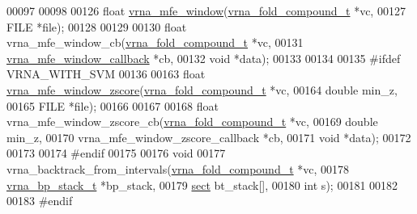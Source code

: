 \begin{DoxyCode}
00097 
00098 
00126 \textcolor{keywordtype}{float} \hyperlink{group__local__mfe__fold_ga689df235a1915a1ad56e377383c044ce}{vrna\_mfe\_window}(\hyperlink{group__fold__compound_structvrna__fc__s}{vrna\_fold\_compound\_t}  *vc,
00127                       FILE                  *file);
00128 
00129 
00130 \textcolor{keywordtype}{float} vrna\_mfe\_window\_cb(\hyperlink{group__fold__compound_structvrna__fc__s}{vrna\_fold\_compound\_t}     *vc,
00131                          \hyperlink{group__mfe__fold_ga4f3e5bc214ef803074ace313cb9571b4}{vrna\_mfe\_window\_callback} *cb,
00132                          \textcolor{keywordtype}{void}                     *data);
00133 
00134 
00135 \textcolor{preprocessor}{#ifdef VRNA\_WITH\_SVM}
00136 
00163 \textcolor{keywordtype}{float} \hyperlink{group__local__mfe__fold_gaa4f67ae94efd08d800c17f9b53423fd6}{vrna\_mfe\_window\_zscore}(\hyperlink{group__fold__compound_structvrna__fc__s}{vrna\_fold\_compound\_t} *vc,
00164                              \textcolor{keywordtype}{double}               min\_z,
00165                              FILE                 *file);
00166 
00167 
00168 \textcolor{keywordtype}{float} vrna\_mfe\_window\_zscore\_cb(\hyperlink{group__fold__compound_structvrna__fc__s}{vrna\_fold\_compound\_t}            *vc,
00169                                 \textcolor{keywordtype}{double}                          min\_z,
00170                                 vrna\_mfe\_window\_zscore\_callback *cb,
00171                                 \textcolor{keywordtype}{void}                            *data);
00172 
00173 
00174 \textcolor{preprocessor}{#endif}
00175 
00176 \textcolor{keywordtype}{void}
00177 vrna\_backtrack\_from\_intervals(\hyperlink{group__fold__compound_structvrna__fc__s}{vrna\_fold\_compound\_t}  *vc,
00178                               \hyperlink{group__data__structures_structvrna__bp__stack__s}{vrna\_bp\_stack\_t}       *bp\_stack,
00179                               \hyperlink{group__data__structures_structvrna__sect__s}{sect}                  bt\_stack[],
00180                               \textcolor{keywordtype}{int}                   s);
00181 
00182 
00183 \textcolor{preprocessor}{#endif}
\end{DoxyCode}

